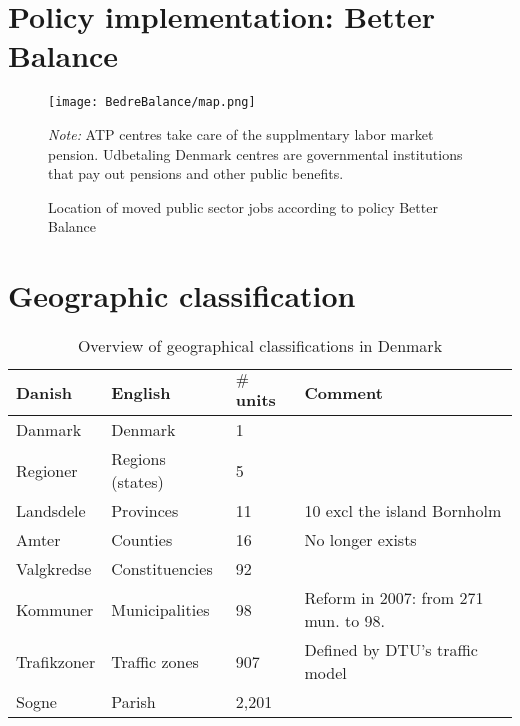 \appendix

\renewcommand{\thesection}{A\arabic{section}}   
\renewcommand{\thetable}{A\arabic{table}}   
\renewcommand{\thefigure}{A\arabic{figure}}
\setcounter{figure}{0} 
\setcounter{table}{0} 

\section{Policy implementation: Better Balance}
\begin{figure}[!htb]
\centering
\begin{minipage}{0.8\textwidth}
\texttt{[image: BedreBalance/map.png]} 
{\tiny \emph{Note:} ATP centres take care of the supplmentary labor market pension. Udbetaling Denmark centres are governmental institutions that pay out pensions and other public benefits.\\ \par}
\end{minipage}
\caption{Location of moved public sector jobs according to policy Better Balance}
\label{apfig:betterbalance}
\end{figure}


\section{Geographic classification}\label{sec:apdescmap}

\begin{table}[!ht]
\caption{Overview of geographical classifications in Denmark}
\label{aptab:geo}
\centering
\begin{tabular}{l l l  l}
Danish & English & $\#$ units & Comment \\
\hline 
Danmark & Denmark & 1 & \\ 
Regioner & Regions (states) & 5 & \\
Landsdele & Provinces & 11  & 10 excl the island Bornholm \\
Amter & Counties & 16 & No longer exists \\
Valgkredse & Constituencies & 92 &\\
Kommuner & Municipalities & 98 & Reform in 2007: from 271 mun. to 98.\\
Trafikzoner & Traffic zones & 907 & Defined by DTU's traffic model\\
Sogne & Parish & 2,201 & \\
\bottomrule

\end{tabular}
\end{table}

